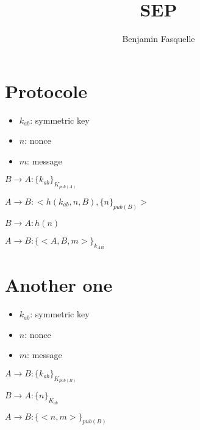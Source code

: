 \documentclass[10pt,a4paper]{article}
\author{Benjamin Fasquelle}
\title{SEP}
\begin{document}
\maketitle


\section{Protocole}

\begin{itemize}
\item $k_{ab}$: symmetric key
\item $n$: nonce
\item $m$: message
\end{itemize}

$B \rightarrow A: \{k_{ab}\}_{K_{pub(A)}}$


$A \rightarrow B: <h(k_{ab}, n, B), \{n\}_{pub(B)} > $

$B \rightarrow A: h(n)$


$A \rightarrow B: \{<A, B, m>\}_{k_{AB}}$



\section{Another one}

\begin{itemize}
\item $k_{ab}$: symmetric key
\item $n$: nonce
\item $m$: message
\end{itemize}

$A \rightarrow B: \{k_{ab}\}_{K_{pub(B)}}$


$B \rightarrow A: \{n\}_{K_{ab}}$


$A \rightarrow B: \{< n, m >\}_{pub(B)} $
\end{document}
